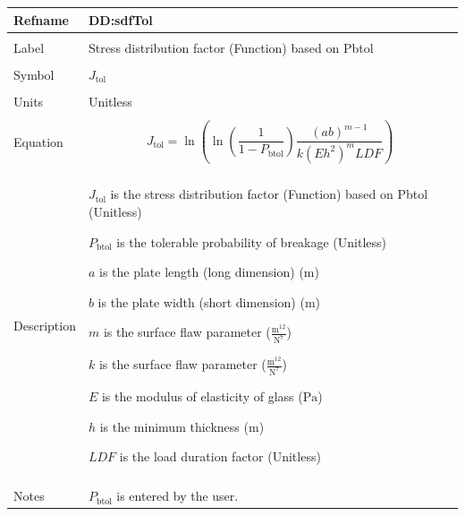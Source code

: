 \documentclass[12pt]{article}
\begin{document}
\vspace{\baselineskip}
\noindent
\begin{minipage}{\textwidth}
\begin{tabular}{>{\raggedright}p{}>{\raggedright\arraybackslash}p{}}
\toprule \textbf{Refname} & \textbf{DD:sdfTol}
\label{DD:sdfTol}
\\ \midrule \\
Label & Stress distribution factor (Function) based on Pbtol
        
\\ \midrule \\
Symbol & ${J_{\text{tol}}}$
         
\\ \midrule \\
Units & Unitless
        
\\ \midrule \\
Equation & \begin{displaymath}
           {J_{\text{tol}}}=\ln\left(\ln\left(\frac{1}{1-{P_{\text{b}\text{tol}}}}\right) \frac{\left(a b\right)^{m-1}}{k \left(E h^{2}\right)^{m} \mathit{LDF}}\right)
           \end{displaymath}
\\ \midrule \\
Description & \begin{symbDescription}
              \item{${J_{\text{tol}}}$ is the stress distribution factor (Function) based on Pbtol (Unitless)}
              \item{${P_{\text{b}\text{tol}}}$ is the tolerable probability of breakage (Unitless)}
              \item{$a$ is the plate length (long dimension) (${\text{m}}$)}
              \item{$b$ is the plate width (short dimension) (${\text{m}}$)}
              \item{$m$ is the surface flaw parameter ($\frac{\text{m}^{12}}{\text{N}^{7}}$)}
              \item{$k$ is the surface flaw parameter ($\frac{\text{m}^{12}}{\text{N}^{7}}$)}
              \item{$E$ is the modulus of elasticity of glass (${\text{Pa}}$)}
              \item{$h$ is the minimum thickness (${\text{m}}$)}
              \item{$\mathit{LDF}$ is the load duration factor (Unitless)}
              \end{symbDescription}
\\ \midrule \\
Notes & ${P_{\text{b}\text{tol}}}$ is entered by the user.
        

\end{tabular}
\end{minipage}
\end{document}
